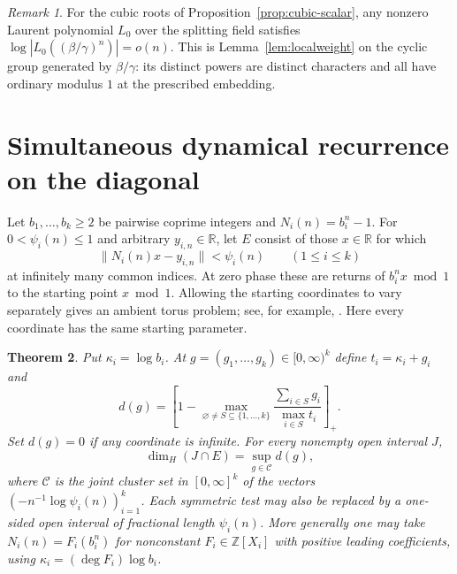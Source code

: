 \documentclass[11pt,a4paper,reqno]{amsart}
\newtheorem{theorem}{Theorem}[section]
\theoremstyle{definition}
\theoremstyle{remark}
\newtheorem{remark}[theorem]{Remark}
\numberwithin{equation}{section}
\begin{document}
\begin{remark}\label{rem:cubic-localweight}
For the cubic roots of Proposition~\ref{prop:cubic-scalar}, any
nonzero Laurent polynomial \(L_0\) over the splitting field satisfies
\(\log|L_0((\beta/\gamma)^n)|=o(n)\). This is
Lemma~\ref{lem:localweight} on the cyclic group generated by
\(\beta/\gamma\): its distinct powers are distinct characters
and all have ordinary modulus \(1\) at the prescribed embedding.
\end{remark}

\section{Simultaneous dynamical recurrence on the diagonal}\label{sec:rec}
Let \(b_1,\ldots,b_k\ge2\) be pairwise coprime integers and \(N_i(n)=b_i^n-1\). For \(0<\psi_i(n)\le1\) and arbitrary \(y_{i,n}\in\mathbb R\), let \(E\) consist of those \(x\in\mathbb R\) for which
\begin{equation}\label{eq:rectests}
                   \|N_i(n)x-y_{i,n}\|<\psi_i(n)\qquad (1\le i\le k)
\end{equation}
at infinitely many common indices. At zero phase these are returns of \(b_i^nx\bmod1\) to the starting point \(x\bmod1\). Allowing the starting coordinates to vary separately gives an ambient torus problem; see, for example, \cite{ambient}. Here every coordinate has the same starting parameter.
\begin{theorem}\label{thm:rec}
Put \(\kappa_i=\log b_i\). At \(g=(g_1,\ldots,g_k)\in[0,\infty)^k\) define \(t_i=\kappa_i+g_i\) and
\begin{equation}\label{eq:recformula}
 d(g)=\left[1-\max_{\varnothing\ne S\subseteq\{1,\ldots,k\}}
        \frac{\sum_{i\in S}g_i}{\max_{i\in S}t_i}\right]_+.
\end{equation}
Set \(d(g)=0\) if any coordinate is infinite. For every nonempty open interval \(J\),
\[
             \dim_H(J\cap E)=\sup_{g\in\mathcal C}d(g),
\]
where \(\mathcal C\) is the joint cluster set in \([0,\infty]^k\) of the vectors \((-n^{-1}\log\psi_i(n))_{i=1}^k\). Each symmetric test may also be replaced by a one-sided open interval of fractional length \(\psi_i(n)\). More generally one may take \(N_i(n)=F_i(b_i^n)\) for nonconstant \(F_i\in\mathbb Z[X_i]\) with positive leading coefficients, using \(\kappa_i=(\deg F_i)\log b_i\).
\end{theorem}
\end{document}
